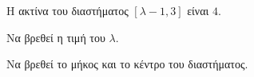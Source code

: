 Η ακτίνα του διαστήματος $ [\lambda-1,3] $ είναι $ 4 $.
\begin{alist}
\item Να βρεθεί η τιμή του $ \lambda $.
\item Να βρεθεί το μήκος και το κέντρο του διαστήματος.
\end{alist}
